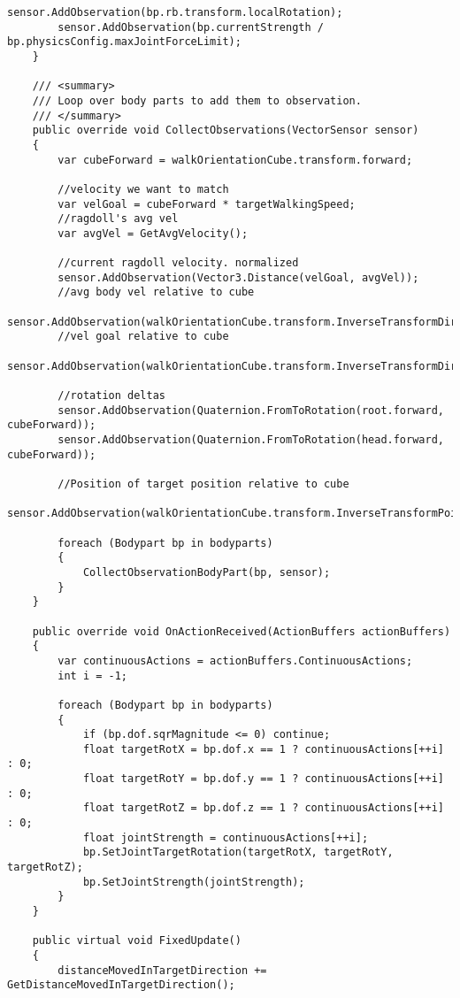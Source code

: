\begin{lstlisting}[caption={Agenten Skript},captionpos=b,label={lst:skript_agent1}]
        sensor.AddObservation(bp.rb.transform.localRotation);
        sensor.AddObservation(bp.currentStrength / bp.physicsConfig.maxJointForceLimit);
    }

    /// <summary>
    /// Loop over body parts to add them to observation.
    /// </summary>
    public override void CollectObservations(VectorSensor sensor)
    {
        var cubeForward = walkOrientationCube.transform.forward;

        //velocity we want to match
        var velGoal = cubeForward * targetWalkingSpeed;
        //ragdoll's avg vel
        var avgVel = GetAvgVelocity();

        //current ragdoll velocity. normalized
        sensor.AddObservation(Vector3.Distance(velGoal, avgVel));
        //avg body vel relative to cube
        sensor.AddObservation(walkOrientationCube.transform.InverseTransformDirection(avgVel));
        //vel goal relative to cube
        sensor.AddObservation(walkOrientationCube.transform.InverseTransformDirection(velGoal));

        //rotation deltas
        sensor.AddObservation(Quaternion.FromToRotation(root.forward, cubeForward));
        sensor.AddObservation(Quaternion.FromToRotation(head.forward, cubeForward));

        //Position of target position relative to cube
        sensor.AddObservation(walkOrientationCube.transform.InverseTransformPoint(target.transform.position));

        foreach (Bodypart bp in bodyparts)
        {
            CollectObservationBodyPart(bp, sensor);
        }
    }

    public override void OnActionReceived(ActionBuffers actionBuffers)
    {
        var continuousActions = actionBuffers.ContinuousActions;
        int i = -1;

        foreach (Bodypart bp in bodyparts)
        {
            if (bp.dof.sqrMagnitude <= 0) continue;
            float targetRotX = bp.dof.x == 1 ? continuousActions[++i] : 0;
            float targetRotY = bp.dof.y == 1 ? continuousActions[++i] : 0;
            float targetRotZ = bp.dof.z == 1 ? continuousActions[++i] : 0;
            float jointStrength = continuousActions[++i];
            bp.SetJointTargetRotation(targetRotX, targetRotY, targetRotZ);
            bp.SetJointStrength(jointStrength);
        }
    }

    public virtual void FixedUpdate()
    {
        distanceMovedInTargetDirection += GetDistanceMovedInTargetDirection();


\end{lstlisting}
